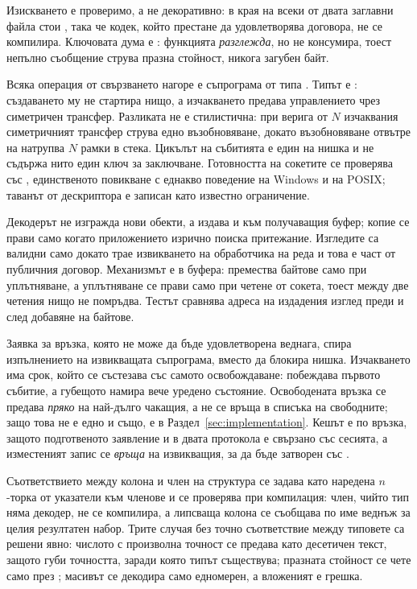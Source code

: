 Изискването е проверимо, а не декоративно: в края на всеки от двата заглавни файла стои
, така че кодек, който престане да удовлетворява
договора, не се компилира. Ключовата дума е : функцията \emph{разглежда}, но не
консумира, тоест непълно съобщение струва празна стойност, никога загубен байт.

Всяка операция от свързването нагоре е съпрограма от типа . Типът е
: създаването му не стартира нищо, а изчакването предава управлението чрез
симетричен трансфер. Разликата не е стилистична: при верига от $N$ изчаквания симетричният
трансфер струва едно възобновяване, докато възобновяване отвътре на 
натрупва $N$ рамки в стека. Цикълът на събитията е един на нишка и не съдържа нито един ключ
за заключване. Готовността на сокетите се проверява със , единственото повикване
с еднакво поведение на Windows и на POSIX; таванът от  дескриптора е
записан като известно ограничение.

Декодерът не изгражда нови обекти, а издава  и
 към получаващия буфер; копие се прави само когато приложението
изрично поиска притежание. Изгледите са валидни само докато трае извикването на обработчика
на реда и това е част от публичния договор. Механизмът е в буфера: 
премества байтове само при уплътняване, а уплътняване се прави само при четене от сокета,
тоест между две четения нищо не помръдва. Тестът
 сравнява адреса на издадения изглед
преди и след добавяне на байтове.

Заявка за връзка, която не може да бъде удовлетворена веднага, спира изпълнението на
извикващата съпрограма, вместо да блокира нишка. Изчакването има срок, който се състезава със
самото освобождаване: побеждава първото събитие, а губещото намира вече уредено състояние.
Освободената връзка се предава \emph{пряко} на най-дълго чакащия, а не се връща в списъка на
свободните; защо това не е едно и също, е в Раздел~\ref{sec:implementation}. Кешът е по
връзка, защото подготвеното заявление и в двата протокола е свързано със сесията, а
изместеният запис се \emph{връща} на извикващия, за да бъде затворен със .

Съответствието между колона и член на структура се задава като  наредена
$n$-торка от указатели към членове и се проверява при компилация: член, чийто тип няма
декодер, не се компилира, а липсваща колона се съобщава по име веднъж за целия резултатен
набор. Трите случая без точно съответствие между типовете са решени явно: числото с
произволна точност се предава като десетичен текст, защото  губи точността,
заради която типът съществува; празната стойност се чете само през ;
масивът се декодира само едномерен, а вложеният е грешка.
